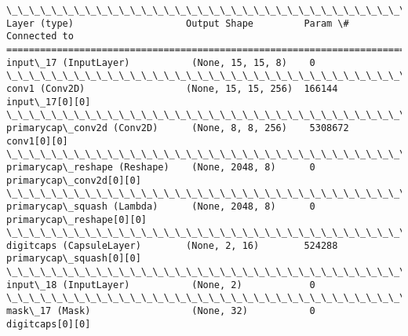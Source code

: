\documentclass[11pt]{article}
\begin{document}
    \begin{Verbatim}[commandchars=\\\{\}]
\_\_\_\_\_\_\_\_\_\_\_\_\_\_\_\_\_\_\_\_\_\_\_\_\_\_\_\_\_\_\_\_\_\_\_\_\_\_\_\_\_\_\_\_\_\_\_\_\_\_\_\_\_\_\_\_\_\_\_\_\_\_\_\_\_\_\_\_\_\_\_\_\_\_\_\_\_\_\_\_\_\_\_\_\_\_\_\_\_\_\_\_\_\_\_\_\_\_
Layer (type)                    Output Shape         Param \#     Connected to                     
==================================================================================================
input\_17 (InputLayer)           (None, 15, 15, 8)    0                                            
\_\_\_\_\_\_\_\_\_\_\_\_\_\_\_\_\_\_\_\_\_\_\_\_\_\_\_\_\_\_\_\_\_\_\_\_\_\_\_\_\_\_\_\_\_\_\_\_\_\_\_\_\_\_\_\_\_\_\_\_\_\_\_\_\_\_\_\_\_\_\_\_\_\_\_\_\_\_\_\_\_\_\_\_\_\_\_\_\_\_\_\_\_\_\_\_\_\_
conv1 (Conv2D)                  (None, 15, 15, 256)  166144      input\_17[0][0]                   
\_\_\_\_\_\_\_\_\_\_\_\_\_\_\_\_\_\_\_\_\_\_\_\_\_\_\_\_\_\_\_\_\_\_\_\_\_\_\_\_\_\_\_\_\_\_\_\_\_\_\_\_\_\_\_\_\_\_\_\_\_\_\_\_\_\_\_\_\_\_\_\_\_\_\_\_\_\_\_\_\_\_\_\_\_\_\_\_\_\_\_\_\_\_\_\_\_\_
primarycap\_conv2d (Conv2D)      (None, 8, 8, 256)    5308672     conv1[0][0]                      
\_\_\_\_\_\_\_\_\_\_\_\_\_\_\_\_\_\_\_\_\_\_\_\_\_\_\_\_\_\_\_\_\_\_\_\_\_\_\_\_\_\_\_\_\_\_\_\_\_\_\_\_\_\_\_\_\_\_\_\_\_\_\_\_\_\_\_\_\_\_\_\_\_\_\_\_\_\_\_\_\_\_\_\_\_\_\_\_\_\_\_\_\_\_\_\_\_\_
primarycap\_reshape (Reshape)    (None, 2048, 8)      0           primarycap\_conv2d[0][0]          
\_\_\_\_\_\_\_\_\_\_\_\_\_\_\_\_\_\_\_\_\_\_\_\_\_\_\_\_\_\_\_\_\_\_\_\_\_\_\_\_\_\_\_\_\_\_\_\_\_\_\_\_\_\_\_\_\_\_\_\_\_\_\_\_\_\_\_\_\_\_\_\_\_\_\_\_\_\_\_\_\_\_\_\_\_\_\_\_\_\_\_\_\_\_\_\_\_\_
primarycap\_squash (Lambda)      (None, 2048, 8)      0           primarycap\_reshape[0][0]         
\_\_\_\_\_\_\_\_\_\_\_\_\_\_\_\_\_\_\_\_\_\_\_\_\_\_\_\_\_\_\_\_\_\_\_\_\_\_\_\_\_\_\_\_\_\_\_\_\_\_\_\_\_\_\_\_\_\_\_\_\_\_\_\_\_\_\_\_\_\_\_\_\_\_\_\_\_\_\_\_\_\_\_\_\_\_\_\_\_\_\_\_\_\_\_\_\_\_
digitcaps (CapsuleLayer)        (None, 2, 16)        524288      primarycap\_squash[0][0]          
\_\_\_\_\_\_\_\_\_\_\_\_\_\_\_\_\_\_\_\_\_\_\_\_\_\_\_\_\_\_\_\_\_\_\_\_\_\_\_\_\_\_\_\_\_\_\_\_\_\_\_\_\_\_\_\_\_\_\_\_\_\_\_\_\_\_\_\_\_\_\_\_\_\_\_\_\_\_\_\_\_\_\_\_\_\_\_\_\_\_\_\_\_\_\_\_\_\_
input\_18 (InputLayer)           (None, 2)            0                                            
\_\_\_\_\_\_\_\_\_\_\_\_\_\_\_\_\_\_\_\_\_\_\_\_\_\_\_\_\_\_\_\_\_\_\_\_\_\_\_\_\_\_\_\_\_\_\_\_\_\_\_\_\_\_\_\_\_\_\_\_\_\_\_\_\_\_\_\_\_\_\_\_\_\_\_\_\_\_\_\_\_\_\_\_\_\_\_\_\_\_\_\_\_\_\_\_\_\_
mask\_17 (Mask)                  (None, 32)           0           digitcaps[0][0]                  

\end{Verbatim}
\end{document}
